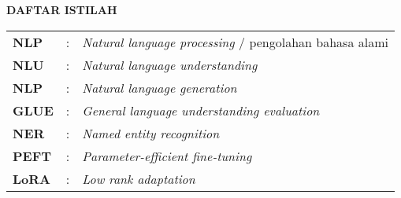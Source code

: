 \newpage
\begin{center}
    \Large \bfseries{DAFTAR ISTILAH}
    \bigskip

    \begin{table}[h]
        \begin{tabularx}{\textwidth}{lcX}
            \textbf{NLP} & : & \textit{Natural language processing} / pengolahan bahasa alami \\
            \textbf{NLU} & : & \textit{Natural language understanding} \\
            \textbf{NLP} & : & \textit{Natural language generation} \\
            \textbf{GLUE} & : & \textit{General language understanding evaluation} \\
            \textbf{NER} & : & \textit{Named entity recognition} \\
            \textbf{PEFT} & : & \textit{Parameter-efficient fine-tuning} \\
            \textbf{LoRA} & : & \textit{Low rank adaptation} \\
        \end{tabularx}
    \end{table}
\end{center}
